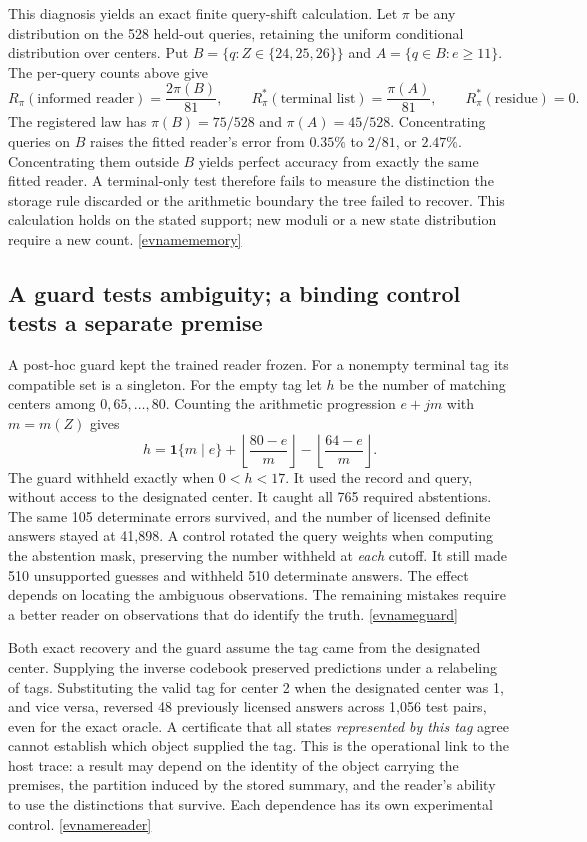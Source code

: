 \documentclass[11pt,letterpaper]{article}
\newcommand{\evref}[1]{\hyperlink{ev-#1}{\textsf{\small[\csname evname#1\endcsname]}}}
\begin{document}
This diagnosis yields an exact finite query-shift calculation. Let \(\pi\) be any distribution on the 528 held-out queries, retaining the uniform conditional distribution over centers. Put \(B=\{q: Z\in\{24,25,26\}\}\) and \(A=\{q\in B:e\ge11\}\). The per-query counts above give
\[
 R_\pi(\text{informed reader})=\frac{2\pi(B)}{81},
 \qquad R^*_\pi(\text{terminal list})=\frac{\pi(A)}{81},
 \qquad R^*_\pi(\text{residue})=0 .
\]
The registered law has \(\pi(B)=75/528\) and \(\pi(A)=45/528\). Concentrating queries on \(B\) raises the fitted reader's error from \(0.35\%\) to \(2/81\), or \(2.47\%\). Concentrating them outside \(B\) yields perfect accuracy from exactly the same fitted reader. A terminal-only test therefore fails to measure the distinction the storage rule discarded or the arithmetic boundary the tree failed to recover. This calculation holds on the stated support; new moduli or a new state distribution require a new count. \evref{memory}

\subsection{A guard tests ambiguity; a binding control tests a separate premise}

A post-hoc guard kept the trained reader frozen. For a nonempty terminal tag its compatible set is a singleton. For the empty tag let \(h\) be the number of matching centers among \(0,65,\ldots,80\). Counting the arithmetic progression \(e+jm\) with \(m=m(Z)\) gives
\[
 h=\mathbf{1}\{m\mid e\}
     +\left\lfloor\frac{80-e}{m}\right\rfloor
     -\left\lfloor\frac{64-e}{m}\right\rfloor .
\]
The guard withheld exactly when \(0<h<17\). It used the record and query, without access to the designated center. It caught all 765 required abstentions. The same 105 determinate errors survived, and the number of licensed definite answers stayed at 41,898. A control rotated the query weights when computing the abstention mask, preserving the number withheld at \emph{each} cutoff. It still made 510 unsupported guesses and withheld 510 determinate answers. The effect depends on locating the ambiguous observations. The remaining mistakes require a better reader on observations that do identify the truth. \evref{guard}

Both exact recovery and the guard assume the tag came from the designated center. Supplying the inverse codebook preserved predictions under a relabeling of tags. Substituting the valid tag for center 2 when the designated center was 1, and vice versa, reversed 48 previously licensed answers across 1,056 test pairs, even for the exact oracle. A certificate that all states \emph{represented by this tag} agree cannot establish which object supplied the tag. This is the operational link to the host trace: a result may depend on the identity of the object carrying the premises, the partition induced by the stored summary, and the reader's ability to use the distinctions that survive. Each dependence has its own experimental control. \evref{reader}
\end{document}
